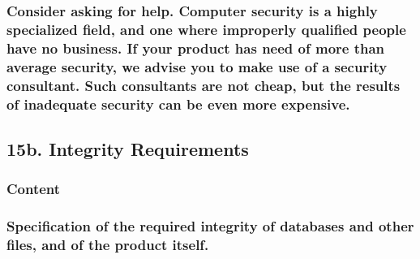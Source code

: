\documentclass[
]{article}
\begin{document}
\hypertarget{consider-asking-for-help.-computer-security-is-a-highly-specialized-field-and-one-where-improperly-qualified-people-have-no-business.-if-your-product-has-need-of-more-than-average-security-we-advise-you-to-make-use-of-a-security-consultant.-such-consultants-are-not-cheap-but-the-results-of-inadequate-security-can-be-even-more-expensive.}{%
\subsubsection{\texorpdfstring{Consider asking for help. Computer
security is a highly specialized field, and one where improperly
qualified people have no business. If your product has need of more than
average security, we advise you to make use of a security consultant.
Such consultants are not cheap, but the results of inadequate security
can be even more expensive.
}{Consider asking for help. Computer security is a highly specialized field, and one where improperly qualified people have no business. If your product has need of more than average security, we advise you to make use of a security consultant. Such consultants are not cheap, but the results of inadequate security can be even more expensive. }}\label{consider-asking-for-help.-computer-security-is-a-highly-specialized-field-and-one-where-improperly-qualified-people-have-no-business.-if-your-product-has-need-of-more-than-average-security-we-advise-you-to-make-use-of-a-security-consultant.-such-consultants-are-not-cheap-but-the-results-of-inadequate-security-can-be-even-more-expensive.}}

\hypertarget{b.-integrity-requirements}{%
\subsection{15b. Integrity
Requirements}\label{b.-integrity-requirements}}

\hypertarget{content-53}{%
\subsubsection{Content}\label{content-53}}

\hypertarget{specification-of-the-required-integrity-of-databases-and-other-files-and-of-the-product-itself.}{%
\subsubsection{Specification of the required integrity of databases and
other files, and of the product
itself.}\label{specification-of-the-required-integrity-of-databases-and-other-files-and-of-the-product-itself.}}
\end{document}
